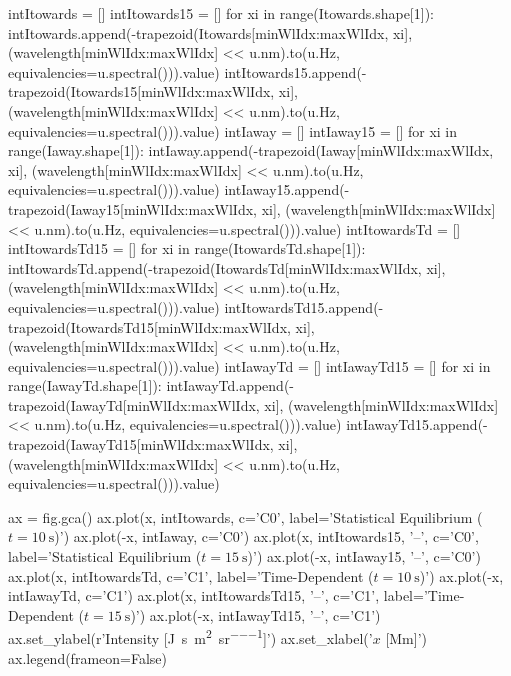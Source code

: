 \begin{pycode}[2DRT]
    intItowards = []
    intItowards15 = []
    for xi in range(Itowards.shape[1]):
        intItowards.append(-trapezoid(Itowards[minWlIdx:maxWlIdx, xi],
                           (wavelength[minWlIdx:maxWlIdx] << u.nm).to(u.Hz,
                                      equivalencies=u.spectral())).value)
        intItowards15.append(-trapezoid(Itowards15[minWlIdx:maxWlIdx, xi],
                           (wavelength[minWlIdx:maxWlIdx] << u.nm).to(u.Hz,
                                      equivalencies=u.spectral())).value)
    intIaway = []
    intIaway15 = []
    for xi in range(Iaway.shape[1]):
        intIaway.append(-trapezoid(Iaway[minWlIdx:maxWlIdx, xi],
                        (wavelength[minWlIdx:maxWlIdx] << u.nm).to(u.Hz,
                                   equivalencies=u.spectral())).value)
        intIaway15.append(-trapezoid(Iaway15[minWlIdx:maxWlIdx, xi],
                        (wavelength[minWlIdx:maxWlIdx] << u.nm).to(u.Hz,
                                   equivalencies=u.spectral())).value)
    intItowardsTd = []
    intItowardsTd15 = []
    for xi in range(ItowardsTd.shape[1]):
        intItowardsTd.append(-trapezoid(ItowardsTd[minWlIdx:maxWlIdx, xi],
                             (wavelength[minWlIdx:maxWlIdx] << u.nm).to(u.Hz,
                                        equivalencies=u.spectral())).value)
        intItowardsTd15.append(-trapezoid(ItowardsTd15[minWlIdx:maxWlIdx, xi],
                             (wavelength[minWlIdx:maxWlIdx] << u.nm).to(u.Hz,
                                        equivalencies=u.spectral())).value)
    intIawayTd = []
    intIawayTd15 = []
    for xi in range(IawayTd.shape[1]):
        intIawayTd.append(-trapezoid(IawayTd[minWlIdx:maxWlIdx, xi],
                          (wavelength[minWlIdx:maxWlIdx] << u.nm).to(u.Hz,
                                     equivalencies=u.spectral())).value)
        intIawayTd15.append(-trapezoid(IawayTd15[minWlIdx:maxWlIdx, xi],
                          (wavelength[minWlIdx:maxWlIdx] << u.nm).to(u.Hz,
                                     equivalencies=u.spectral())).value)

    ax = fig.gca()
    ax.plot(x, intItowards, c='C0', label='Statistical Equilibrium ($t=\SI{10}{\second}$)')
    ax.plot(-x, intIaway, c='C0')
    ax.plot(x, intItowards15, '--', c='C0', label='Statistical Equilibrium ($t=\SI{15}{\second}$)')
    ax.plot(-x, intIaway15, '--', c='C0')
    ax.plot(x, intItowardsTd, c='C1', label='Time-Dependent ($t=\SI{10}{\second}$)')
    ax.plot(-x, intIawayTd, c='C1')
    ax.plot(x, intItowardsTd15, '--', c='C1', label='Time-Dependent ($t=\SI{15}{\second}$)')
    ax.plot(-x, intIawayTd15, '--', c='C1')
    ax.set_ylabel(r'Intensity [\si{\joule\per\second\per\square\metre\per\steradian}]')
    ax.set_xlabel('$x$ [Mm]')
    ax.legend(frameon=False)



\end{pycode}
